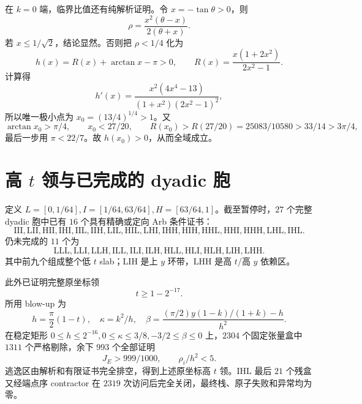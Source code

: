 \documentclass[UTF8,12pt,openany,fontset=fandol]{ctexrep}
\theoremstyle{definition}
\begin{document}
在 $k=0$ 端，临界比值还有纯解析证明。令 $x=-\tan\theta>0$，则
\begin{equation}
 \rho=\frac{x^2(\theta-x)}{2(\theta+x)}.
\end{equation}
若 $x\le1/\sqrt2$，结论显然。否则把 $\rho<1/4$ 化为
\begin{equation}
 h(x)=R(x)+\arctan x-\pi>0,\qquad
 R(x)=\frac{x(1+2x^2)}{2x^2-1}.
\end{equation}
计算得
\begin{equation}
 h'(x)=\frac{x^2(4x^4-13)}{(1+x^2)(2x^2-1)^2},
\end{equation}
所以唯一极小点为 $x_0=(13/4)^{1/4}>1$。又
\begin{equation}
 \arctan x_0>\pi/4,\qquad x_0<27/20,\qquad
 R(x_0)>R(27/20)=25083/10580>33/14>3\pi/4,
\end{equation}
最后一步用 $\pi<22/7$。故 $h(x_0)>0$，从而全域成立。

\section{高 $t$ 领与已完成的 dyadic 胞}

定义 $L=[0,1/64],I=[1/64,63/64],H=[63/64,1]$。截至暂停时，$27$ 个完整 dyadic 胞中已有 $16$ 个具有精确或定向 Arb 条件证书：
\begin{equation*}
 \mathrm{III,LII,HII,IHI,IIL,IIH,LIL,HIL,LHI,IHH,HIH,HHL,HHI,HHH,LHL,IHL}.
\end{equation*}
仍未完成的 $11$ 个为
\begin{equation*}
 \mathrm{LLL,LLI,LLH,ILL,ILI,ILH,HLL,HLI,HLH,LIH,LHH}.
\end{equation*}
其中前九个组成整个低 $t$ slab；$\mathrm{LIH}$ 是上 $y$ 环带，$\mathrm{LHH}$ 是高 $t$/高 $y$ 依赖区。

此外已证明完整原坐标领
\begin{equation}
 t\ge1-2^{-17}.
\end{equation}
所用 blow-up 为
\begin{equation}
 h=\frac\pi2(1-t),\quad \kappa=k^2/h,\quad
 \beta=\frac{(\pi/2)y(1-k)/(1+k)-h}{h^2}.
\end{equation}
在稳定矩形 $0\le h\le2^{-16},0\le\kappa\le3/8,-3/2\le\beta\le0$ 上，$2304$ 个固定张量盒中 $1311$ 个严格剔除，余下 $993$ 个全部证明
\begin{equation}
 J_E>999/1000,\qquad \rho_i/h^2<5.
\end{equation}
逃逸区由解析和有限证书完全排空，得到上述原坐标高 $t$ 领。$\mathrm{IHL}$ 最后 $21$ 个残盒又经端点序 contractor 在 $2319$ 次访问后完全关闭，最终栈、原子失败和异常均为零。
\end{document}
